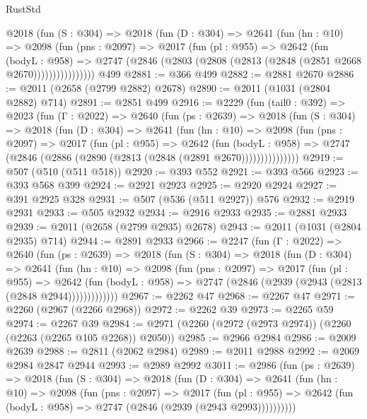 \begin{lexlean}{RustStd}
\begin{coremodule}
          @2018
            (fun (S : @304) =>
            @2018
              (fun (D : @304) =>
              @2641
                (fun (hn : @10) =>
                @2098
                  (fun (pns : @2097) =>
                  @2017
                    (fun (pl : @955) =>
                    @2642
                      (fun (bodyL : @958) =>
                      @2747 (@2846 (@2803 (@2808 (@2813 (@2848 (@2851 @2668 @2670))))))))))))))))
    @499
@2881 := @366 @499
@2882 := @2881 @2670
@2886 := @2011 (@2658 (@2799 @2882) @2678)
@2890 := @2011 (@1031 (@2804 @2882) @714)
@2891 := @2851 @499
@2916 := @2229
    (fun (tail0 : @392) =>
    @2023
      (fun (Γ : @2022) =>
      @2640
        (fun (ps : @2639) =>
        @2018
          (fun (S : @304) =>
          @2018
            (fun (D : @304) =>
            @2641
              (fun (hn : @10) =>
              @2098
                (fun (pns : @2097) =>
                @2017
                  (fun (pl : @955) =>
                  @2642
                    (fun (bodyL : @958) =>
                    @2747 (@2846 (@2886 (@2890 (@2813 (@2848 (@2891 @2670)))))))))))))))
@2919 := @507 (@510 (@511 @518))
@2920 := @393 @552
@2921 := @393 @566
@2923 := @393 @568 @399
@2924 := @2921 @2923
@2925 := @2920 @2924
@2927 := @391 @2925 @328
@2931 := @507 (@536 (@511 @2927)) @576
@2932 := @2919 @2931
@2933 := @505 @2932
@2934 := @2916 @2933
@2935 := @2881 @2933
@2939 := @2011 (@2658 (@2799 @2935) @2678)
@2943 := @2011 (@1031 (@2804 @2935) @714)
@2944 := @2891 @2933
@2966 := @2247
    (fun (Γ : @2022) =>
    @2640
      (fun (ps : @2639) =>
      @2018
        (fun (S : @304) =>
        @2018
          (fun (D : @304) =>
          @2641
            (fun (hn : @10) =>
            @2098
              (fun (pns : @2097) =>
              @2017
                (fun (pl : @955) =>
                @2642
                  (fun (bodyL : @958) => @2747 (@2846 (@2939 (@2943 (@2813 (@2848 @2944)))))))))))))
@2967 := @2262 @47
@2968 := @2267 @47
@2971 := @2260 (@2967 (@2266 @2968))
@2972 := @2262 @39
@2973 := @2265 @59
@2974 := @2267 @39
@2984 := @2971 (@2260 (@2972 (@2973 @2974)) (@2260 (@2263 (@2265 @105 @2268)) @2050))
@2985 := @2966 @2984
@2986 := @2009 @2639
@2988 := @2811 (@2062 @2984)
@2989 := @2011 @2988
@2992 := @2069 @2984 @2847 @2944
@2993 := @2989 @2992
@3011 := @2986
    (fun (ps : @2639) =>
    @2018
      (fun (S : @304) =>
      @2018
        (fun (D : @304) =>
        @2641
          (fun (hn : @10) =>
          @2098
            (fun (pns : @2097) =>
            @2017
              (fun (pl : @955) =>
              @2642 (fun (bodyL : @958) => @2747 (@2846 (@2939 (@2943 @2993))))))))))

\end{coremodule}
\end{lexlean}
